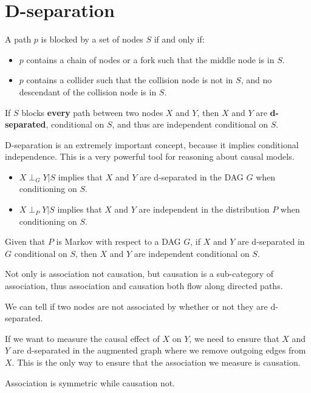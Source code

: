 \section{D-separation}
\begin{definition}
    A path $p$ is blocked by a set of nodes $S$ if and only if:
    \begin{itemize}
        \item $p$ contains a chain of nodes or a fork such that the middle node
              is in $S$.
        \item $p$ contains a collider such that the collision node is not in $S$,
              and no descendant of the collision node is in $S$.
    \end{itemize}
    If $S$ blocks \textbf{every} path between two nodes $X$ and $Y$, then $X$ and
    $Y$ are \textbf{d-separated}, conditional on $S$, and thus are independent
    conditional on $S$.
\end{definition}
D-separation is an extremely important concept, because it implies conditional
independence. This is a very powerful tool for reasoning about causal models.
\begin{itemize}
    \item $X \perp_G Y | S$ implies that $X$ and $Y$ are d-separated in the DAG
          $G$ when conditioning on $S$.
    \item $X \perp_P Y | S$ implies that $X$ and $Y$ are independent in the
          distribution $P$ when conditioning on $S$.
\end{itemize}
\begin{definition}
    Given that $P$ is Markov with respect to a DAG $G$, if $X$ and $Y$ are d-separated
    in $G$ conditional on $S$, then $X$ and $Y$ are independent conditional on $S$.
\end{definition}

Not only is association not causation, but causation is a sub-category of
association, thus association and causation both flow along directed paths.

We can tell if two nodes are not associated by whether or not they are d-separated.

If we want to measure the causal effect of $X$ on $Y$, we need to ensure that $X$
and $Y$ are d-separated in the augmented graph where we remove outgoing edges
from $X$. This is the only way to ensure that the association we measure is causation.

\begin{note}
    Association is symmetric while causation not.
\end{note}

